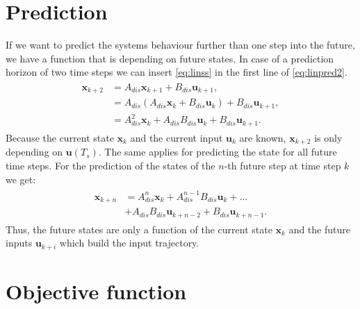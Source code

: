 
\section{Prediction}
\label{sec:prediction}

If we want to predict the systems behaviour further than one step into the future, we have a function that is depending on future states.
In case of a prediction horizon of two time steps we can insert \eqref{eq:linss} in the first line of \eqref{eq:linpred2}.
\begin{align}\label{eq:linpred2}
\begin{split}
\mathbf{x}_{k+2} &= A_{dis} \mathbf{x}_{k+1} + B_{dis} \mathbf{u}_{k+1}, \\
                 &= A_{dis} \left(  A_{dis} \mathbf{x}_k + B_{dis} \mathbf{u}_k \right) + B_{dis} \mathbf{u}_{k+1}, \\
                 &= A_{dis}^2 \mathbf{x}_k + A_{dis} B_{dis} \mathbf{u}_k + B_{dis} \mathbf{u}_{k+1}.
\end{split}
\end{align}
Because the current state $\mathbf{x}_k$ and the current input $\mathbf{u}_k$ are known, $\mathbf{x}_{k+2}$ is only depending on $\mathbf{u}(T_s)$.
The same applies for predicting the state for all future time steps.
For the prediction of the states of the $n$-th future step at time step $k$ we get:
\begin{align}\label{eq:linpredn}
\begin{split}
\mathbf{x}_{k+n}&=A_{dis}^n\mathbf{x}_k+A_{dis}^{n-1}B_{dis}\mathbf{u}_k+\ldots\\
                &+A_{dis}B_{dis}\mathbf{u}_{k+n-2}+B_{dis}\mathbf{u}_{k+n-1}.
\end{split}
\end{align}
Thus, the future states are only a function of the current state $\mathbf{x}_k$ and the future inputs $\mathbf{u}_{k+i}$ which build the input trajectory.


\section{Objective function}
\label{sec:objective}

